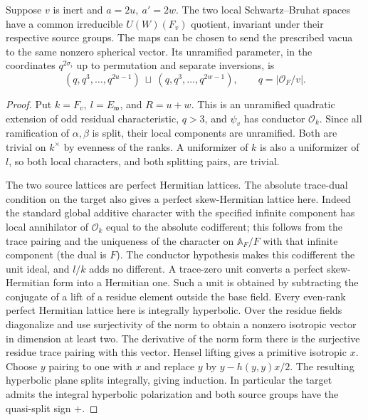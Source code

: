 \begin{proposition}\label{threal:inert}
Suppose \(v\) is inert and \(a=2u,\ a'=2w\). The two local
Schwartz--Bruhat spaces have a common irreducible \(U(W)(F_v)\)
quotient, invariant under their respective source groups. The maps
can be chosen to send the prescribed vacua to the same nonzero
spherical vector. Its unramified parameter, in the coordinates
\(q^{2\sigma_i}\) up to permutation and separate inversions, is
\[
      (q,q^3,\ldots,q^{2u-1})\ \sqcup\
      (q,q^3,\ldots,q^{2w-1}),\qquad q=|\mathcal O_F/v|.
\]
\end{proposition}
\begin{proof}
Put \(k=F_v,\ l=E_{\mathfrak w}\), and \(R=u+w\). This is an
unramified quadratic extension of odd residual characteristic, \(q>3\),
and \(\psi_v\) has conductor \(\mathcal O_k\). Since all ramification
of \(\alpha,\beta\) is split, their local components are unramified.
Both are trivial on \(k^\times\) by evenness of the ranks. A
uniformizer of \(k\) is also a uniformizer of \(l\), so both local
characters, and both splitting pairs, are trivial.

The two source lattices are perfect Hermitian lattices. The absolute
trace-dual condition on the target also gives a perfect skew-Hermitian
lattice here. Indeed the standard global additive character with the
specified infinite component has local annihilator of \(\mathcal O_k\)
equal to the absolute codifferent; this follows from the trace
pairing and the uniqueness of the character on \(\mathbb A_F/F\)
with that infinite component (the dual is \(F\)). The conductor
hypothesis makes this codifferent the unit ideal, and \(l/k\) adds
no different. A trace-zero unit converts a perfect skew-Hermitian
form into a Hermitian one. Such a unit is obtained by subtracting
the conjugate of a lift of a residue element outside the base field.
Every even-rank perfect Hermitian lattice here is integrally
hyperbolic. Over the residue fields diagonalize and use surjectivity
of the norm to obtain a nonzero isotropic vector in dimension at
least two. The derivative of the norm form there is the surjective
residue trace pairing with this vector. Hensel lifting gives a
primitive isotropic \(x\). Choose \(y\) pairing to one with \(x\)
and replace \(y\) by \(y-h(y,y)x/2\). The resulting hyperbolic plane
splits integrally, giving induction. In particular the target admits
the integral hyperbolic polarization and both source groups have the
quasi-split sign \(+\).


\end{proof}
